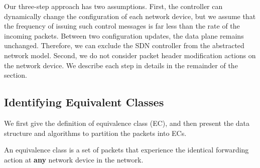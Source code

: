 Our three-step approach has two assumptions. First, the controller can dynamically change the configuration of each network device, but we assume that the frequency of issuing such control messages is far less than the rate of the incoming packets. Between two configuration updates, the data plane remains unchanged. Therefore, we can exclude the SDN controller from the abstracted network model. Second, we do not consider packet header modification actions on the network device. We describe each step in details in the remainder of the section.

   
\subsection{Identifying Equivalent Classes}
\label{ec}

We first give the definition of equivalence class (EC), and then present the data structure and algorithms to partition the packets into ECs.

\begin{definition}
An equivalence class is a set of packets that experience the identical forwarding action at \textbf{any} network device in the network. 
\label{Def:EC}
\end{definition}

